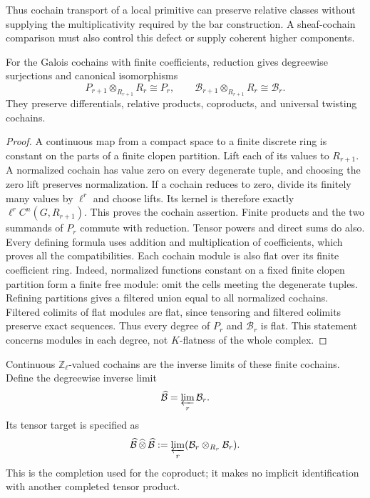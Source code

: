 Thus cochain transport of a local primitive can preserve relative
classes without supplying the multiplicativity required by the bar
construction. A sheaf-cochain comparison must also control this defect
or supply coherent higher components.

\begin{proposition}\label{v4-arith:relative-bar:prop:coefficients}
For the Galois cochains with finite coefficients, reduction gives
degreewise surjections and canonical isomorphisms
\[
 P_{r+1}\otimes_{R_{r+1}}R_r\cong P_r,
 \qquad
 \mathcal{B}_{r+1}\otimes_{R_{r+1}}R_r\cong\mathcal{B}_r.
\]
They preserve differentials, relative products, coproducts, and
universal twisting cochains.
\end{proposition}
\begin{proof}
A continuous map from a compact space to a finite discrete ring is
constant on the parts of a finite clopen partition. Lift each of its
values to $R_{r+1}$. A normalized cochain has value zero on every
degenerate tuple, and choosing the zero lift preserves normalization.
If a cochain reduces to zero, divide its finitely many values by
$\ell^r$ and choose lifts. Its kernel is therefore exactly
$\ell^r C^n(G,R_{r+1})$. This proves the cochain assertion.
Finite products and the two summands of $P_r$ commute with reduction.
Tensor powers and direct sums do also. Every defining formula uses
addition and multiplication of coefficients, which proves all the
compatibilities.
Each cochain module is also flat over its finite coefficient ring.
Indeed, normalized functions constant on a fixed finite clopen partition
form a finite free module: omit the cells meeting the degenerate tuples.
Refining partitions gives a filtered union equal to all normalized
cochains. Filtered colimits of flat modules are flat, since tensoring
and filtered colimits preserve exact sequences. Thus every degree of
$P_r$ and $\mathcal{B}_r$ is flat. This statement concerns modules in each
degree, not $K$-flatness of the whole complex.
\end{proof}

Continuous $\mathbb{Z}_\ell$-valued cochains are the inverse limits of these
finite cochains. Define the degreewise inverse limit
\[
 \widehat{\mathcal{B}}=\varprojlim_r\mathcal{B}_r.
\]
Its tensor target is specified as
\[
 \widehat{\mathcal{B}}\,\widehat\otimes\,\widehat{\mathcal{B}}
 :=\varprojlim_r(\mathcal{B}_r\otimes_{R_r}\mathcal{B}_r).
\]
This is the completion used for the coproduct; it makes no implicit
identification with another completed tensor product.

